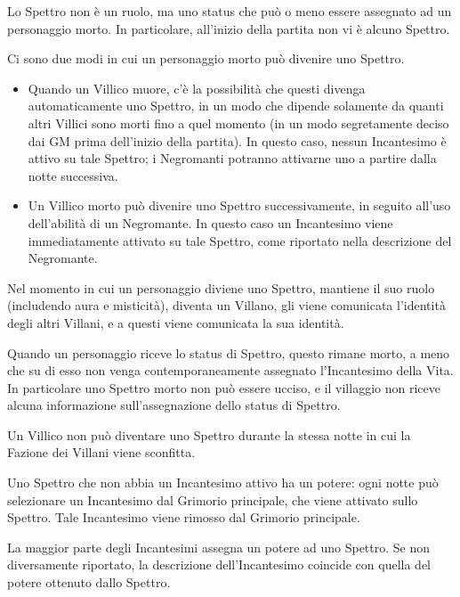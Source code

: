 \documentclass[a4paper,10pt]{article}
\begin{document}
Lo Spettro non è un ruolo, ma uno status che può o meno essere assegnato ad un personaggio morto. In particolare, all'inizio della partita non vi è alcuno Spettro.

Ci sono due modi in cui un personaggio morto può divenire uno Spettro.

\begin{itemize}
      \item Quando un Villico muore, c'è la possibilità che questi divenga automaticamente uno Spettro, in un modo che dipende solamente da quanti altri Villici sono morti fino a quel momento (in un modo segretamente deciso dai GM prima dell'inizio della partita). In questo caso, nessun Incantesimo è attivo su tale Spettro; i Negromanti potranno attivarne uno a partire dalla notte successiva.

      \item Un Villico morto può divenire uno Spettro successivamente, in seguito all'uso dell'abilità di un Negromante. In questo caso un Incantesimo viene immediatamente attivato su tale Spettro, come riportato nella descrizione del Negromante.
\end{itemize}

Nel momento in cui un personaggio diviene uno Spettro, mantiene il suo ruolo (includendo aura e misticità), diventa un Villano, gli viene comunicata l'identità degli altri Villani, e a questi viene comunicata la sua identità.

Quando un personaggio riceve lo status di Spettro, questo rimane morto, a meno che su di esso non venga contemporaneamente assegnato l'Incantesimo della Vita. In particolare uno Spettro morto non può essere ucciso, e il villaggio non riceve alcuna informazione sull'assegnazione dello status di Spettro.

Un Villico non può diventare uno Spettro durante la stessa notte in cui la Fazione dei Villani viene sconfitta.

Uno Spettro che non abbia un Incantesimo attivo ha un potere: ogni notte può selezionare un Incantesimo dal Grimorio principale, che viene attivato sullo Spettro. Tale Incantesimo viene rimosso dal Grimorio principale.

La maggior parte degli Incantesimi assegna un potere ad uno Spettro. Se non diversamente riportato, la descrizione dell'Incantesimo coincide con quella del potere ottenuto dallo Spettro.
\end{document}
